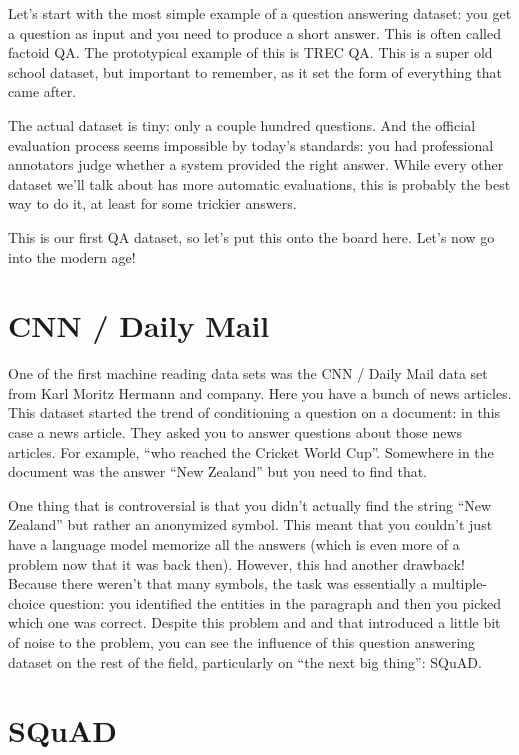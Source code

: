 Let’s start with the most simple example of a question answering
dataset: you get a question as input and you need to produce a short
answer.  This is often called factoid QA.  The prototypical example of
this is TREC QA.  This is a super old school dataset, but important to
remember, as it set the form of everything that came after.

The actual dataset is tiny: only a couple hundred questions.  And the
official evaluation process seems impossible by today’s standards: you
had professional annotators judge whether a system provided the right
answer.  While every other dataset we’ll talk about has more automatic
evaluations, this is probably the best way to do it, at least for some
trickier answers.

This is our first QA dataset, so let’s put this onto the board here.
Let’s now go into the modern age!

\section{CNN / Daily Mail}

One of the first machine reading data sets was the CNN / Daily Mail
data set from Karl Moritz Hermann and company.  Here you have a bunch
of news articles.  This dataset started the trend of conditioning a
question on a document: in this case a news article.  They asked you
to answer questions about those news articles.  For example, “who
reached the Cricket World Cup”.  Somewhere in the document was the
answer “New Zealand” but you need to find that.

One thing that is controversial is that you didn’t actually find the
string “New Zealand” but rather an anonymized symbol.  This meant that
you couldn’t just have a language model memorize all the answers
(which is even more of a problem now that it was back then).  However,
this had another drawback!  Because there weren’t that many symbols,
the task was essentially a multiple-choice question: you identified
the entities in the paragraph and then you picked which one was
correct.  Despite this problem and and that introduced a little bit of
noise to the problem, you can see the influence of this question
answering dataset on the rest of the field, particularly on “the next
big thing”: SQuAD.

\section{SQuAD}

